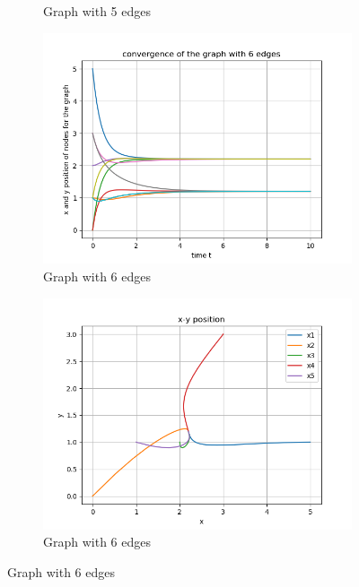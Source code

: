 \documentclass{article}
\begin{document}
\begin{problem}
\begin{figure}[!ht]
\begin{subfigure}{0.4\textwidth}
            \caption{Graph with 5 edges}
        \end{subfigure}
        \begin{subfigure}{0.4\textwidth}
            \includegraphics[width=\textwidth]{./img/Figure_3.png}
            \caption{Graph with 6 edges}
        \end{subfigure}
        \begin{subfigure}{0.4\textwidth}
            \includegraphics[width=\textwidth]{./img/Figure_4.png}
            \caption{Graph with 6 edges}
        \end{subfigure}
    \end{figure}


\end{problem}
\end{document}
